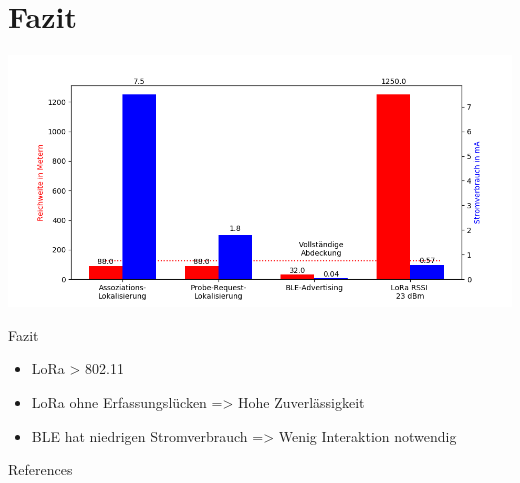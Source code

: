 \documentclass[18pt]{beamer}
\begin{document}
\section{Fazit}
\begin{frame}
	\begin{minipage}[t][0.6\textheight][c]{\textwidth}
		\centering
		\includegraphics[width=\textwidth]{plots/barcomp.png}
	\end{minipage}
	

	\begin{block}{Fazit}
			\begin{itemize}
				\item LoRa > 802.11
				\item LoRa ohne Erfassungslücken => Hohe Zuverlässigkeit
				\item BLE hat niedrigen Stromverbrauch => Wenig Interaktion notwendig
			\end{itemize}
	\end{block}

\end{frame}


\appendix
\beginbackup

\begin{frame}[allowframebreaks]{References}
\printbibliography
\end{frame}

\backupend
\end{document}

